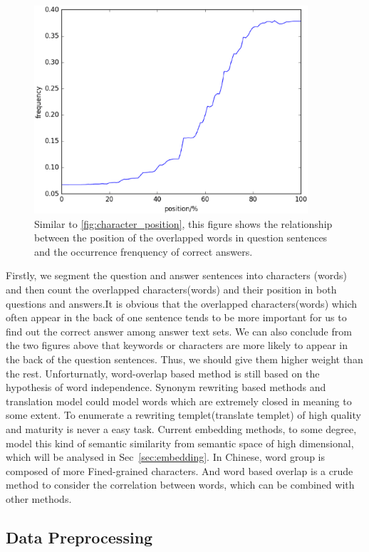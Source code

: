 \documentclass{llncs}
\begin{document}
\begin{figure}
\centering
\includegraphics[width=4in]{figures/word_position.eps}
\caption{Similar to \ref{fig:character_position}, this figure shows the relationship between the position of the overlapped words in question sentences and the occurrence frenquency of correct answers.}
\label{fig:word_position}
\end{figure}



Firstly, we segment the question and answer sentences into characters (words) and then count the overlapped characters(words) and their position in both questions and answers.It is obvious that the overlapped characters(words) which often appear in the back of one sentence tends to be more important for us to find out the correct answer among answer text sets. We can also conclude from the two figures above that keywords or characters are more likely to appear in the back of the question sentences. Thus, we should give them higher weight than the rest.
Unforturnatly, word-overlap based method is still based on the hypothesis of word independence. Synonym rewriting based methods and translation model could model words which are extremely closed in meaning to some extent. To enumerate a rewriting templet(translate templet) of high quality and maturity is never a easy task. Current embedding methods, to some degree, model this kind of semantic similarity from semantic space of high dimensional, which will be analysed in Sec~\ref{sec:embedding}.
In Chinese, word group is composed of more Fined-grained characters. And word based overlap is a crude method to consider the correlation between words, which can be combined with other methods.


\subsection{Data Preprocessing}
\label{sec:preprocess}
\end{document}
